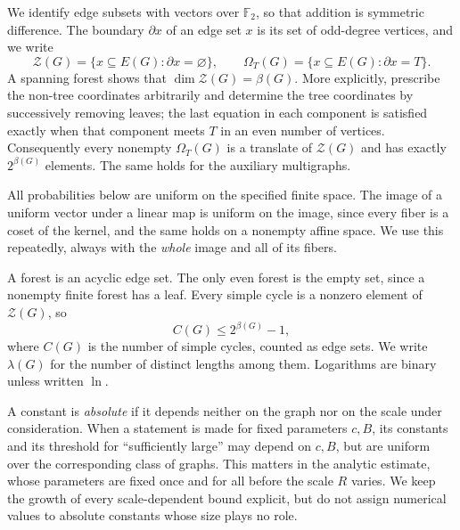 \documentclass[11pt,a4paper]{article}
\numberwithin{equation}{section}
\theoremstyle{definition}
\theoremstyle{remark}
\newcommand{\F}{\mathbb F_2}
\newcommand{\cZ}{\mathcal Z}
\newcommand{\Om}{\Omega}
\begin{document}
We identify edge subsets with vectors over $\F$, so that addition is symmetric difference. The boundary $\partial x$ of an edge set $x$ is its set of odd-degree vertices, and we write
\[
 \cZ(G)=\{x\subseteq E(G):\partial x=\varnothing\},
 \qquad
 \Om_T(G)=\{x\subseteq E(G):\partial x=T\}.
\]
A spanning forest shows that $\dim\cZ(G)=\beta(G)$. More explicitly, prescribe the non-tree coordinates arbitrarily and determine the tree coordinates by successively removing leaves; the last equation in each component is satisfied exactly when that component meets $T$ in an even number of vertices. Consequently every nonempty $\Om_T(G)$ is a translate of $\cZ(G)$ and has exactly $2^{\beta(G)}$ elements. The same holds for the auxiliary multigraphs.

All probabilities below are uniform on the specified finite space. The image of a uniform vector under a linear map is uniform on the image, since every fiber is a coset of the kernel, and the same holds on a nonempty affine space. We use this repeatedly, always with the \emph{whole} image and all of its fibers.

A forest is an acyclic edge set. The only even forest is the empty set, since a nonempty finite forest has a leaf. Every simple cycle is a nonzero element of $\cZ(G)$, so
\begin{equation}\label{eq:cycle-count}
 C(G)\le2^{\beta(G)}-1,
\end{equation}
where $C(G)$ is the number of simple cycles, counted as edge sets. We write $\lambda(G)$ for the number of distinct lengths among them. Logarithms are binary unless written $\ln$.

A constant is \emph{absolute} if it depends neither on the graph nor on the scale under consideration. When a statement is made for fixed parameters $c,B$, its constants and its threshold for ``sufficiently large'' may depend on $c,B$, but are uniform over the corresponding class of graphs. This matters in the analytic estimate, whose parameters are fixed once and for all before the scale $R$ varies. We keep the growth of every scale-dependent bound explicit, but do not assign numerical values to absolute constants whose size plays no role.
\end{document}
